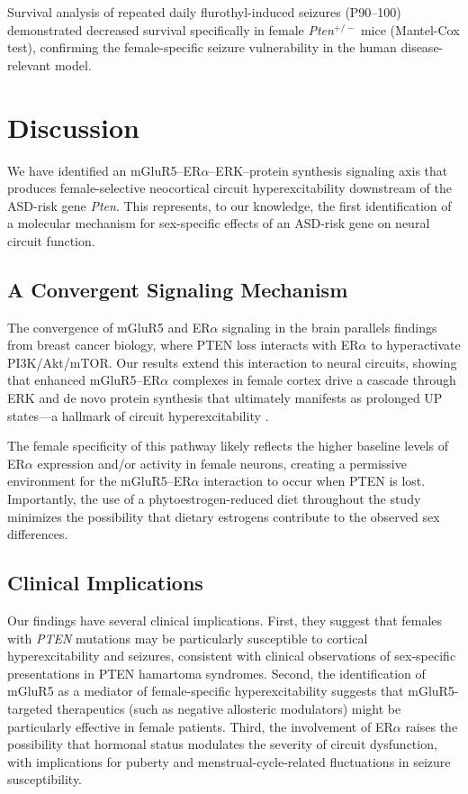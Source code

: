 \documentclass[11pt]{article}
\begin{document}
Survival analysis of repeated daily flurothyl-induced seizures (P90--100) demonstrated decreased survival specifically in female \textit{Pten}$^{+/-}$ mice (Mantel-Cox test), confirming the female-specific seizure vulnerability in the human disease-relevant model.

\section{Discussion}

We have identified an mGluR5--ER$\alpha$--ERK--protein synthesis signaling axis that produces female-selective neocortical circuit hyperexcitability downstream of the ASD-risk gene \textit{Pten}. This represents, to our knowledge, the first identification of a molecular mechanism for sex-specific effects of an ASD-risk gene on neural circuit function.

\subsection{A Convergent Signaling Mechanism}

The convergence of mGluR5 and ER$\alpha$ signaling in the brain parallels findings from breast cancer biology, where PTEN loss interacts with ER$\alpha$ to hyperactivate PI3K/Akt/mTOR. Our results extend this interaction to neural circuits, showing that enhanced mGluR5--ER$\alpha$ complexes in female cortex drive a cascade through ERK and de novo protein synthesis that ultimately manifests as prolonged UP states---a hallmark of circuit hyperexcitability \citep{gibson2008}.

The female specificity of this pathway likely reflects the higher baseline levels of ER$\alpha$ expression and/or activity in female neurons, creating a permissive environment for the mGluR5--ER$\alpha$ interaction to occur when PTEN is lost. Importantly, the use of a phytoestrogen-reduced diet throughout the study minimizes the possibility that dietary estrogens contribute to the observed sex differences.

\subsection{Clinical Implications}

Our findings have several clinical implications. First, they suggest that females with \textit{PTEN} mutations may be particularly susceptible to cortical hyperexcitability and seizures, consistent with clinical observations of sex-specific presentations in PTEN hamartoma syndromes. Second, the identification of mGluR5 as a mediator of female-specific hyperexcitability suggests that mGluR5-targeted therapeutics (such as negative allosteric modulators) might be particularly effective in female patients. Third, the involvement of ER$\alpha$ raises the possibility that hormonal status modulates the severity of circuit dysfunction, with implications for puberty and menstrual-cycle-related fluctuations in seizure susceptibility.
\end{document}
